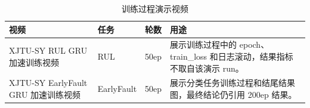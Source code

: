 \begin{table}[H]
\centering
\caption{训练过程演示视频}
\label{tab:demo-videos}
\small
\begin{tabularx}{\textwidth}{p{3.0cm}p{3.0cm}p{2.0cm}Y}
\toprule
视频 & 任务 & 轮数 & 用途 \\
\midrule
XJTU-SY RUL GRU 加速训练视频 & RUL & 50ep & 展示训练过程中的 epoch、train\_loss 和日志滚动，结果指标不取自该演示 run。 \\
XJTU-SY EarlyFault GRU 加速训练视频 & EarlyFault & 50ep & 展示分类任务训练过程和结尾结果图，最终结论仍引用 200ep 结果。 \\
\bottomrule
\end{tabularx}
\end{table}
